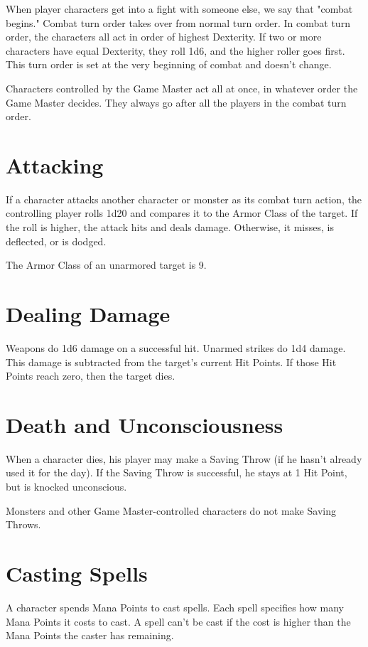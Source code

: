 \begin{multicols}{2}
When player characters get into a fight with someone else, we say that
"combat begins." Combat turn order takes over from normal turn order.
In combat turn order, the characters all act in order of highest Dexterity.
If two or more characters have equal Dexterity, they roll 1d6, and the
higher roller goes first. This turn order is set at the very beginning of
combat and doesn't change.

Characters controlled by the Game Master act all at once, in whatever
order the Game Master decides. They always go after all the players
in the combat turn order.

\section{Attacking}

If a character attacks another character or monster as its combat turn
action, the controlling player rolls 1d20 and compares it to the Armor
Class of the target. If the roll is higher, the attack hits and deals
damage. Otherwise, it misses, is deflected, or is dodged.

The Armor Class of an unarmored target is 9.

\section{Dealing Damage}

Weapons do 1d6 damage on a successful hit. Unarmed strikes do 1d4 damage.
This damage is subtracted from the target's current Hit Points. If those
Hit Points reach zero, then the target dies.

\section{Death and Unconsciousness}

When a character dies, his player may make a Saving Throw (if he hasn't
already used it for the day). If the Saving Throw is successful, he stays
at 1 Hit Point, but is knocked unconscious.

Monsters and other Game Master-controlled characters do not make Saving
Throws.

\section{Casting Spells}

A character spends Mana Points to cast spells. Each spell specifies how
many Mana Points it costs to cast. A spell can't be cast if the cost
is higher than the Mana Points the caster has remaining.


\end{multicols}
